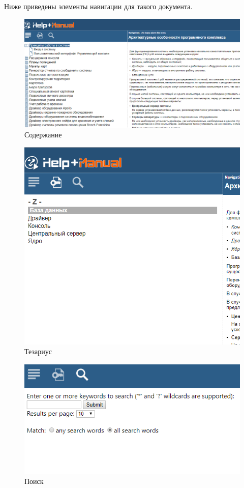 		\FloatBarrier
	
		Ниже приведены элементы навигации для такого документа.
	
		\begin{figure}[h]
			\centering
			\includegraphics[width=0.7\linewidth]{images/table-of-content}
			\caption{Содержание}
			\label{fig:table-of-content}
		\end{figure}
		\begin{figure}[h]
			\centering
			\includegraphics[width=0.7\linewidth]{images/ketword-index}
			\caption{Тезариус}
			\label{fig:ketword-index}
		\end{figure}
		\begin{figure}[h]
			\centering
			\includegraphics[width=0.7\linewidth]{images/search}
			\caption{Поиск}
			\label{fig:search}
		\end{figure}
	
